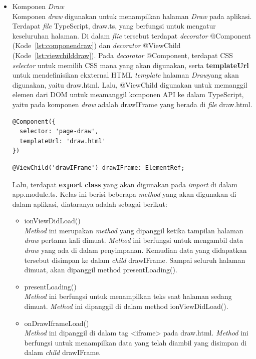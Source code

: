 \begin{itemize}
	\item Komponen \textit{Draw} \\
	Komponen \textit{draw} digunakan untuk menampilkan halaman \textit{Draw} pada aplikasi. Terdapat \textit{file} TypeScript, draw.ts, yang berfungsi untuk mengatur keseluruhan halaman. Di dalam \textit{flie} tersebut terdapat \textit{decorator} @Component (Kode~\ref{lst:componendraw}) dan \textit{decorator} @ViewChild (Kode~\ref{lst:viewchilddraw}). Pada \textit{decorator} @Component, terdapat CSS \textit{selector} untuk memilih CSS mana yang akan digunakan, serta \textbf{templateUrl} untuk mendefinisikan ekxternal HTML \textit{template} halaman \textit{Draw}yang akan digunakan, yaitu draw.html. Lalu, @ViewChild digunakan untuk memanggil elemen dari DOM untuk meamanggil komponen API ke dalam TypeScript, yaitu pada komponen \textit{draw} adalah drawIFrame yang berada di \textit{file} draw.html.
\begin{lstlisting}[language=html, label={lst:componendraw}, caption=@Component pada draw.ts]
@Component({
  selector: 'page-draw',
  templateUrl: 'draw.html'
})
\end{lstlisting} 
	
\begin{lstlisting}[language=html, label={lst:viewchilddraw}, caption=@ViewChild pada draw.ts]
@ViewChild('drawIFrame') drawIFrame: ElementRef;
\end{lstlisting} 

\newpage

	Lalu, terdapat \textbf{export class} yang akan digunakan pada \textit{import} di dalam app.module.ts. Kelas ini berisi beberapa \textit{method} yang akan digunakan di dalam aplikasi, diataranya adalah sebagai berikut:
	
	\begin{itemize}
		\item ionViewDidLoad() \\
		\textit{Method} ini merupakan \textit{method} yang dipanggil ketika tampilan halaman \textit{draw} pertama kali dimuat. \textit{Method} ini berfungsi untuk mengambil data \textit{draw} yang ada di dalam penyimpanan. Kemudian data yang didapatkan tersebut disimpan ke dalam \textit{child} drawIFrame. Sampai seluruh halaman dimuat, akan dipanggil method presentLoading().
		\item presentLoading() \\
		\textit{Method} ini berfungsi untuk menampilkan teks saat halaman sedang dimuat. \textit{Method} ini dipanggil di dalam method ionViewDidLoad().
		\item onDrawIframeLoad() \\
		\textit{Method} ini dipanggil di dalam tag <iframe> pada draw.html. \textit{Method} ini berfungsi untuk menampilkan data yang telah diambil yang disimpan di dalam \textit{child} drawIFrame.
	\end{itemize}
	

\end{itemize}
